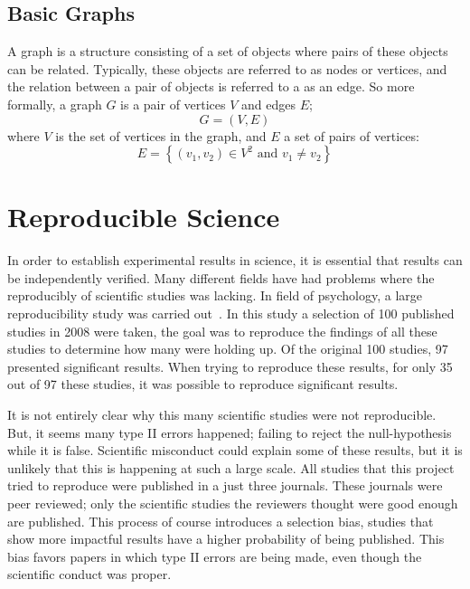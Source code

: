 \subsection{Basic Graphs}
A graph is a structure consisting of a set of objects where pairs of these objects can be related. Typically, these objects are referred to as nodes or vertices, and the relation between a pair of objects is referred to a as an edge. So more formally, a graph $G$ is a pair of vertices $V$ and edges $E$;
\begin{equation}
	G = (V, E)
\end{equation}
where $V$ is the set of vertices in the graph, and $E$ a set of pairs of vertices:
\begin{equation}
	E = \left\{\left(v_1, v_2\right) \in V^2\text{ and } v_1 \neq v_2 \right\}
\end{equation}

\section{Reproducible Science}
In order to establish experimental results in science, it is essential that results can be independently verified. Many different fields have had problems where the reproducibly of scientific studies was lacking. In field of psychology, a large reproducibility study was carried out~\citep{psychology-reproduciblity}. In this study a selection of 100 published studies in 2008 were taken, the goal was to reproduce the findings of all these studies to determine how many were holding up. Of the original 100 studies, 97 presented significant results. When trying to reproduce these results, for only 35 out of 97 these studies, it was possible to reproduce significant results. 

It is not entirely clear why this many scientific studies were not reproducible. But, it seems many type II errors happened; failing to reject the null-hypothesis while it is false. Scientific misconduct could explain some of these results, but it is unlikely that this is happening at such a large scale. All studies that this project tried to reproduce were published in a just three journals. These journals were peer reviewed; only the scientific studies the reviewers thought were good enough are published. This process of course introduces a selection bias, studies that show more impactful results have a higher probability of being published. This bias favors papers in which type II errors are being made, even though the scientific conduct was proper. 

